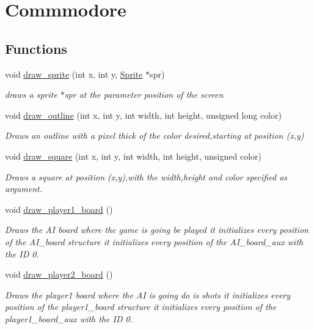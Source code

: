 \hypertarget{group___commodore}{\section{Commmodore}
\label{group___commodore}
}
\subsection*{Functions}
\begin{DoxyCompactItemize}
\item 
void \hyperlink{group___commodore_ga0a8c6c066c745d104c5eb0537c8ef0e3}{draw\-\_\-sprite} (int x, int y, \hyperlink{struct_sprite}{Sprite} $\ast$spr)
\begin{DoxyCompactList}\small\item\em draws a sprite $\ast$spr at the parameter position of the screen \end{DoxyCompactList}\item 
void \hyperlink{group___commodore_ga6363620f1e84e9d16a634beea93c207a}{draw\-\_\-outline} (int x, int y, int width, int height, unsigned long color)
\begin{DoxyCompactList}\small\item\em Draws an outline with a pixel thick of the color desired,starting at position (x,y) \end{DoxyCompactList}\item 
void \hyperlink{group___commodore_gace9f03f02d80c9da290785c2cbb10a85}{draw\-\_\-square} (int x, int y, int width, int height, unsigned color)
\begin{DoxyCompactList}\small\item\em Draws a square at position (x,y),with the width,height and color specified as argument. \end{DoxyCompactList}\item 
void \hyperlink{group___commodore_gab5c2a991d5fe4e74e967ef1696079672}{draw\-\_\-player1\-\_\-board} ()
\begin{DoxyCompactList}\small\item\em Draws the A\-I board where the game is going be played it initializes every position of the A\-I\-\_\-board structure it initializes every position of the A\-I\-\_\-board\-\_\-aux with the I\-D 0. \end{DoxyCompactList}\item 
void \hyperlink{group___commodore_ga7a65bf64332562c5b8f84ca66e8521a7}{draw\-\_\-player2\-\_\-board} ()
\begin{DoxyCompactList}\small\item\em Draws the player1 board where the A\-I is going do is shots it initializes every position of the player1\-\_\-board structure it initializes every position of the player1\-\_\-board\-\_\-aux with the I\-D 0. \end{DoxyCompactList}\item 

\end{DoxyCompactItemize}
